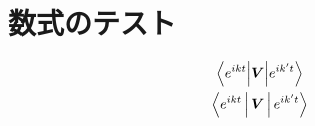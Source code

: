 \documentclass[../main.tex]{subfiles}
\begin{document}
\section{数式のテスト}
\begin{gather}
    \mel**{e^{ikt}}{\bm{V}}{e^{ik't}}\label{eq:phys} \\
    \Braket{e^{ikt} | \bm{V} | e^{ik't}}\label{eq:bra}
\end{gather}
\end{document}
